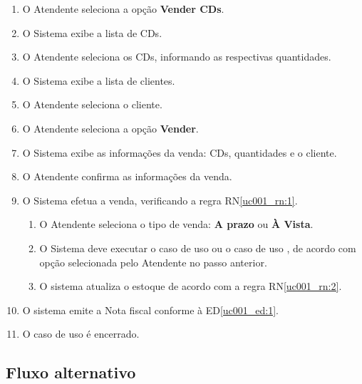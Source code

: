 \begin{enumerate}	
	\item O Atendente seleciona a opção \textbf{Vender CDs}.
	\item O Sistema exibe a lista de CDs. \label{uc001_fluxo_basico:2}
	\item O Atendente seleciona os CDs, informando as respectivas quantidades.
	\item O Sistema exibe a lista de clientes. \label{uc001_fluxo_basico:4}
	\item O Atendente seleciona o cliente.
	\item O Atendente seleciona a opção \textbf{Vender}.
	\item O Sistema exibe as informações da venda: CDs, quantidades e o cliente.
	\item O Atendente confirma as informações da venda. \label{uc001_fluxo_basico:8}
	\item O Sistema efetua a venda, verificando a regra RN\ref{uc001_rn:1}. \label{uc001_fluxo_basico:9}
	\begin{enumerate}
		\item O Atendente seleciona o tipo de venda: \textbf{A prazo} ou \textbf{À Vista}.
		\item O Sistema deve executar o caso de uso  ou o caso de uso , de acordo com opção selecionada pelo Atendente no passo anterior.
		\item O sistema atualiza o estoque de acordo com a regra RN\ref{uc001_rn:2}. 
	\end{enumerate}
	\item O sistema emite a Nota fiscal conforme à ED\ref{uc001_ed:1}.
	\item O caso de uso é encerrado.  
\end{enumerate}

\subsection{Fluxo alternativo}


